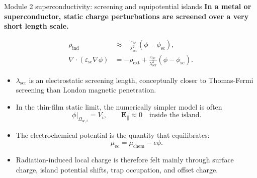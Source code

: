 \documentclass[aspectratio=169,10pt]{beamer}
\begin{document}
\begin{frame}{Module 2 superconductivity: screening and equipotential islands}
\footnotesize
\textbf{In a metal or superconductor, static charge perturbations are screened over a very short length scale.}

\vspace{-0.15em}
\begin{align*}
\rho_{\mathrm{ind}} &\approx -\frac{\varepsilon_{\mathrm{sc}}}{\lambda_{\mathrm{scr}}^2}
\left(\phi-\phi_{\mathrm{sc}}\right),\\[-0.05em]
\nabla\cdot(\varepsilon_{\mathrm{sc}}\nabla\phi)
&= -\rho_{\mathrm{ext}} + \frac{\varepsilon_{\mathrm{sc}}}{\lambda_{\mathrm{scr}}^2}
\left(\phi-\phi_{\mathrm{sc}}\right).
\end{align*}

\vspace{-0.2em}
\begin{itemize}
    \item $\lambda_{\mathrm{scr}}$ is an electrostatic screening length, conceptually closer to Thomas-Fermi screening than London magnetic penetration.
    \item In the thin-film static limit, the numerically simpler model is often
    \[
        \phi|_{\Omega_{\mathrm{sc},i}}=V_i,
        \qquad
        \mathbf E_{\parallel}\approx 0 \quad \text{inside the island}.
    \]
    \item The electrochemical potential is the quantity that equilibrates:
    \[
        \mu_{\mathrm{ec}}=\mu_{\mathrm{chem}}-e\phi.
    \]
    \item Radiation-induced local charge is therefore felt mainly through surface charge, island potential shifts, trap occupation, and offset charge.
\end{itemize}
\end{frame}
\end{document}
